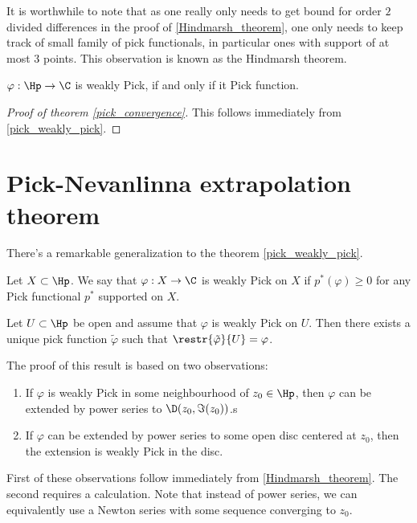 It is worthwhile to note that as one really only needs to get bound for order $2$ divided differences in the proof of \ref{Hindmarsh_theorem}, one only needs to keep track of small family of pick functionals, in particular ones with support of at most $3$ points. This observation is known as the Hindmarsh theorem.

\begin{kor}\label{pick_weakly_pick}
	$\varphi : \Hp \to \C$ is weakly Pick, if and only if it Pick function.
\end{kor}

\begin{proof}[Proof of theorem \ref{pick_convergence}]
	This follows immediately from \ref{pick_weakly_pick}.
\end{proof}

\section{Pick-Nevanlinna extrapolation theorem}

There's a remarkable generalization to the theorem \ref{pick_weakly_pick}.

\begin{maar}
	Let $X \subset \Hp$. We say that $\varphi : X \to \C$ is weakly Pick on $X$ if $p^{*}(\varphi) \geq 0$ for any Pick functional $p^{*}$ supported on $X$.
\end{maar}

\begin{lause}\label{open_pick_interpolation}
	Let $U \subset \Hp$ be open and assume that $\varphi$ is weakly Pick on $U$. Then there exists a unique pick function $\tilde{\varphi}$ such that $\restr{\tilde{\varphi}}{U} = \varphi$.
\end{lause}

The proof of this result is based on two observations:

\begin{enumerate}
	\item If $\varphi$ is weakly Pick in some neighbourhood of $z_{0} \in \Hp$, then $\varphi$ can be extended by power series to $\D(z_{0}, \Im(z_{0}))$.s
	\item If $\varphi$ can be extended by power series to some open disc centered at $z_{0}$, then the extension is weakly Pick in the disc.
\end{enumerate}

First of these observations follow immediately from \ref{Hindmarsh_theorem}. The second requires a calculation. Note that instead of power series, we can equivalently use a Newton series with some sequence converging to $z_{0}$.

